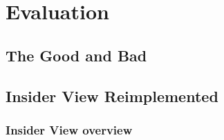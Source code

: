 \chapter{Evaluation}\label{ch:4}

\section{The Good and Bad}

\section{Insider View Reimplemented}
	\subsection {Insider View overview}
	
	\subsection {}